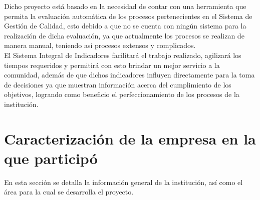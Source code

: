Dicho proyecto est\'a basado en la necesidad de contar con una herramienta que permita la evaluaci\'on autom\'atica de los procesos pertenecientes en el Sistema de Gesti\'on de Calidad, esto debido a que no se cuenta con ning\'un sistema para la realizaci\'on de dicha evaluaci\'on, ya que actualmente los procesos se realizan de manera manual, teniendo as\'i procesos extensos y complicados.\\

El Sistema Integral de Indicadores facilitar\'a el trabajo realizado, agilizar\'a los tiempos requeridos y permitir\'a con esto brindar un mejor servicio a la comunidad, adem\'as de que dichos indicadores influyen directamente para la toma de decisiones ya que muestran informaci\'on acerca del cumplimiento de los objetivos, logrando como beneficio el perfeccionamiento de los procesos de la instituci\'on.


\section{Caracterizaci\'on de la empresa en la que particip\'o}
En esta secci\'on se detalla la informaci\'on general de la instituci\'on, as\'i como el \'area para la cual se desarrolla el proyecto.

